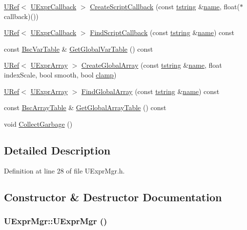 \begin{CompactItemize}
\hyperlink{class_u_ref}{URef}$<$ \hyperlink{class_u_expr_callback}{UExprCallback} $>$ \hyperlink{class_u_expr_mgr_7a3da85c7e2f1809494e029e292dda23}{CreateScriptCallback} (const \hyperlink{common__afx_8h_816fa58fd77499b0edb2c69ebe803d5c}{tstring} \&\hyperlink{glext__bak_8h_bb62efe59ccdd153ce42e1a418352209}{name}, float($\ast$callback)())
\item 
\hyperlink{class_u_ref}{URef}$<$ \hyperlink{class_u_expr_callback}{UExprCallback} $>$ \hyperlink{class_u_expr_mgr_264f27c6ae13776fa159a1bcedbc8a3a}{FindScriptCallback} (const \hyperlink{common__afx_8h_816fa58fd77499b0edb2c69ebe803d5c}{tstring} \&\hyperlink{glext__bak_8h_bb62efe59ccdd153ce42e1a418352209}{name}) const 
\item 
const \hyperlink{class_bsc_var_table}{BscVarTable} \& \hyperlink{class_u_expr_mgr_66f13fd3cf7d28c7ac45dd8b88f28f47}{GetGlobalVarTable} () const 
\item 
\hyperlink{class_u_ref}{URef}$<$ \hyperlink{class_u_expr_array}{UExprArray} $>$ \hyperlink{class_u_expr_mgr_c32f4bc739345cc34ba814886b342d47}{CreateGlobalArray} (const \hyperlink{common__afx_8h_816fa58fd77499b0edb2c69ebe803d5c}{tstring} \&\hyperlink{glext__bak_8h_bb62efe59ccdd153ce42e1a418352209}{name}, float indexScale, bool smooth, bool \hyperlink{glext_8h_3878d3005eeb2d2ef414abc752ba3c9b}{clamp})
\item 
\hyperlink{class_u_ref}{URef}$<$ \hyperlink{class_u_expr_array}{UExprArray} $>$ \hyperlink{class_u_expr_mgr_221fe16c42364455a19c5613c3f01ef4}{FindGlobalArray} (const \hyperlink{common__afx_8h_816fa58fd77499b0edb2c69ebe803d5c}{tstring} \&\hyperlink{glext__bak_8h_bb62efe59ccdd153ce42e1a418352209}{name}) const 
\item 
const \hyperlink{class_bsc_array_table}{BscArrayTable} \& \hyperlink{class_u_expr_mgr_e28c61caea41c0a88a11697475fcb2d2}{GetGlobalArrayTable} () const 
\item 
void \hyperlink{class_u_expr_mgr_8babe6017bf15496526870d8d3254bbf}{CollectGarbage} ()
\end{CompactItemize}


\subsection{Detailed Description}


Definition at line 28 of file UExprMgr.h.

\subsection{Constructor \& Destructor Documentation}
\hypertarget{class_u_expr_mgr_b24ea40407f2cb207a97045051c7a10a}{
\subsubsection[{UExprMgr}]{\setlength{\rightskip}{0pt plus 5cm}UExprMgr::UExprMgr ()}}
\label{class_u_expr_mgr_b24ea40407f2cb207a97045051c7a10a}




